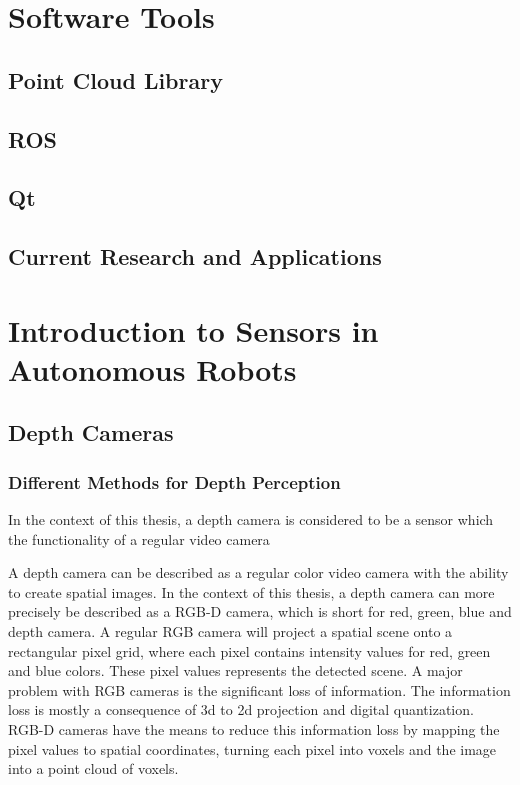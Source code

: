 \section{Software Tools}

\subsection{Point Cloud Library}

\subsection{ROS}

\subsection{Qt}


\subsection{Current Research and Applications}

\section{Introduction to Sensors in Autonomous Robots}

\subsection{Depth Cameras}

\subsubsection{Different Methods for Depth Perception}

In the context of this thesis, a depth camera is considered to be a sensor which the functionality of a regular video camera 

A depth camera can be described as a regular color video camera with the ability to create spatial images. In the context of this thesis, a depth camera can  more precisely be described as a RGB-D camera, which is short for red, green, blue and depth camera. A regular RGB camera will project a spatial scene onto a rectangular pixel grid, where each pixel contains intensity values for red, green and blue colors. These pixel values represents the detected scene. A major problem with RGB cameras is the significant loss of information. The information loss is mostly a consequence of 3d to 2d projection and digital quantization. RGB-D cameras have the means to reduce this information loss by mapping the pixel values to spatial coordinates, turning each pixel into voxels and the image into a point cloud of voxels. 

